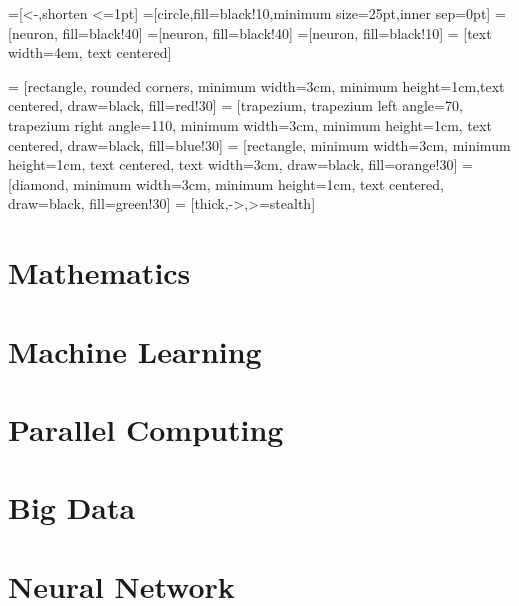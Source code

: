 \documentclass[12pt, right open]{memoir}
\begin{document}
=[<-,shorten <=1pt]
=[circle,fill=black!10,minimum size=25pt,inner sep=0pt]
=[neuron, fill=black!40]
=[neuron, fill=black!40]
=[neuron, fill=black!10]
 = [text width=4em, text centered]

 = [rectangle, rounded corners, minimum width=3cm, minimum height=1cm,text centered, draw=black, fill=red!30]
 = [trapezium, trapezium left angle=70, trapezium right angle=110, minimum width=3cm, minimum height=1cm, text centered, draw=black, fill=blue!30]
 = [rectangle, minimum width=3cm, minimum height=1cm, text centered, text width=3cm, draw=black, fill=orange!30]
 = [diamond, minimum width=3cm, minimum height=1cm, text centered, draw=black, fill=green!30]
 = [thick,->,>=stealth]


\tableofcontents
\listoffigures
\listoftables

\part{Mathematics}


\part{Machine Learning}


\part{Parallel Computing}

\part{Big Data}


\part{Neural Network}

\end{document}
